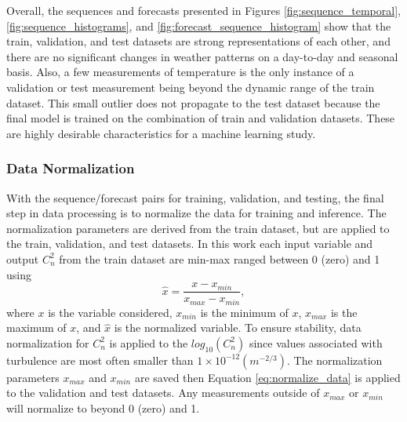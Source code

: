 Overall, the sequences and forecasts presented in Figures \ref{fig:sequence_temporal}, \ref{fig:sequence_histograms}, and \ref{fig:forecast_sequence_histogram} show that the train, validation, and test datasets are strong representations of each other, and there are no significant changes in weather patterns on a day-to-day and seasonal basis. Also, a few measurements of temperature is the only instance of a validation or test measurement being beyond the dynamic range of the train dataset. This small outlier does not propagate to the test dataset because the final model is trained on the combination of train and validation datasets. These are highly desirable characteristics for a machine learning study.


\subsubsection{Data Normalization}
With the sequence/forecast pairs for training, validation, and testing, the final step in data processing is to normalize the data for training and inference. The normalization parameters are derived from the train dataset, but are applied to the train, validation, and test datasets. In this work each input variable and output $C_{n}^{2}$ from the train dataset are min-max ranged between 0 (zero) and 1 using
\begin{equation} \label{eq:normalize_data}
	\hat{x} = \frac{x - x_{min}}{x_{max} - x_{min}},
\end{equation}
where $x$ is the variable considered, $x_{min}$ is the minimum of $x$, $x_{max}$ is the maximum of $x$, and $\hat{x}$ is the normalized variable. To ensure stability, data normalization for $C_{n}^{2}$ is applied to the $log_{10}(C_{n}^{2})$ since values associated with turbulence are most often smaller than $1 \times 10^{-12} (m^{-2/3})$. The normalization parameters $x_{max}$ and $x_{min}$ are saved then Equation \ref{eq:normalize_data} is applied to the validation and test datasets. Any measurements outside of $x_{max}$ or $x_{min}$ will normalize to beyond 0 (zero) and 1.

